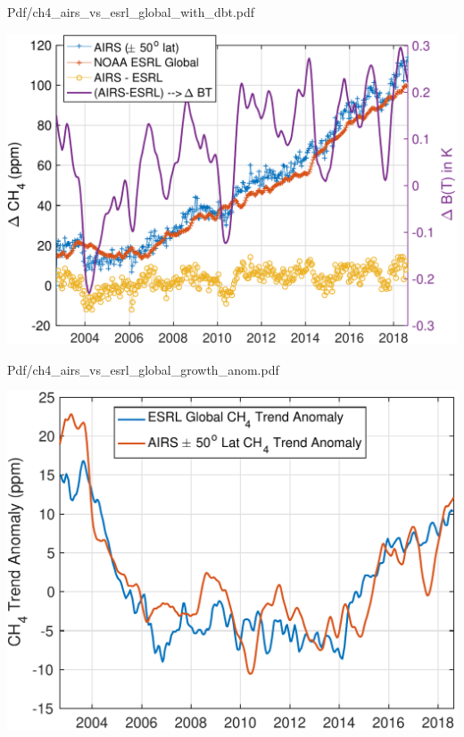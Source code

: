 \documentclass[presentation]{beamer}
\begin{document}
\begin{frame}[label={sec:org8c8b687}]{Pdf/ch4\_airs\_vs\_esrl\_global\_with\_dbt.pdf}
\begin{center}
\includegraphics[width=0.7\linewidth]{./Figs/Pdf/ch4_airs_vs_esrl_global_with_dbt.pdf}
\end{center}
\end{frame}

\begin{frame}[label={sec:orge6f2aa2}]{Pdf/ch4\_airs\_vs\_esrl\_global\_growth\_anom.pdf}
\begin{center}
\includegraphics[width=0.7\linewidth]{./Figs/Pdf/ch4_airs_vs_esrl_global_growth_anom.pdf}
\end{center}
\end{frame}
\end{document}
